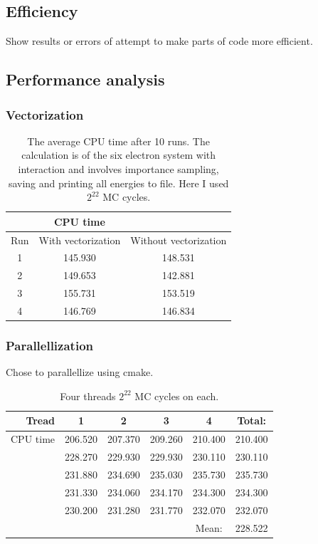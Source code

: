 \subsection{Efficiency}

Show results or errors of attempt to make parts of code more efficient. 

\subsection{Performance analysis}

\subsubsection{Vectorization}

\begin{table}[H]\caption{The average CPU time after 10 runs. The calculation is of the six electron system with interaction and involves importance sampling, saving and printing all energies to file. Here I used $2^{22}$ MC cycles. }\label{tab:CPUtime_vectorization}
\center
\begin{tabular}{c|cc}
 & CPU time & \\ \hline
Run & With vectorization & Without vectorization \\ \hline
1 & 145.930 & 148.531 \\
2 & 149.653 & 142.881 \\
3 & 155.731 & 153.519 \\
4 & 146.769 & 146.834 \\
\end{tabular}
\end{table}

\subsubsection{Parallellization}

Chose to parallellize using cmake.

\begin{table}[H]\caption{Four threads $2^{22}$ MC cycles on each.}\label{tab:CPUtime_treads}
\center
\begin{tabular}{r|cccc|c}
Tread & 1 & 2 & 3 & 4 & Total: \\ \hline
CPU time & 206.520 & 207.370 & 209.260 & 210.400 & 210.400 \\
& 228.270 & 229.930 & 229.930 & 230.110 & 230.110 \\
& 231.880 & 234.690 & 235.030 & 235.730 & 235.730 \\
& 231.330 & 234.060 & 234.170 & 234.300 & 234.300 \\
& 230.200 & 231.280 & 231.770 & 232.070 & 232.070 \\ \hline
 &  &  &  & Mean: & 228.522 \\
\end{tabular}\\
\end{table}

